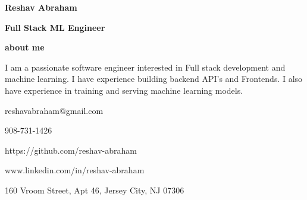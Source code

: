 \documentclass{article}
\begin{document}
\begin{minipage}[t][0pt]{8in\linewidth}
    \begin{minipage}[t]{5.5in\linewidth}
    \Huge\vspace{0in}\hspace{-0.30em}\textbf{Reshav Abraham}  

    \vspace{0em}\hspace{-0.2em}\Large\textbf{Full Stack ML Engineer} 

    \vspace{0.5em}\hspace{0em}\small\textbf{about me} 

        \begin{minipage}[t]{0.6\textwidth\hspace{0em}}
        I am a passionate software engineer interested in Full stack development
        and machine learning. I have experience building backend API's and Frontends. I also have experience in training and serving machine learning models. \par
        \end{minipage}
    \end{minipage}
    \begin{minipage}[t]{17em\linewidth\hspace{-3em}}
        
        \vspace{0.7em}
        \faEnvelopeO\hspace{0.4em}\small\mdseries\textrm{reshavabraham@gmail.com}

        \faPhone\hspace{0.4em}\small\mdseries\textrm{908-731-1426}
        
        \faGithub\hspace{0.4em}\small\mdseries\textrm{https://github.com/reshav-abraham}

        \faLinkedin\hspace{0.4em}\small\mdseries\textrm{www.linkedin.com/in/reshav-abraham}

        \faHome\hspace{0.4em}\small\mdseries\textrm{160 Vroom Street, Apt 46, Jersey City, NJ 07306}
    \end{minipage}

\vspace{0.5em}

\begin{minipage}[t]{0.45\textwidth\hspace{0in}}


\end{minipage}
\end{minipage}
\end{document}
